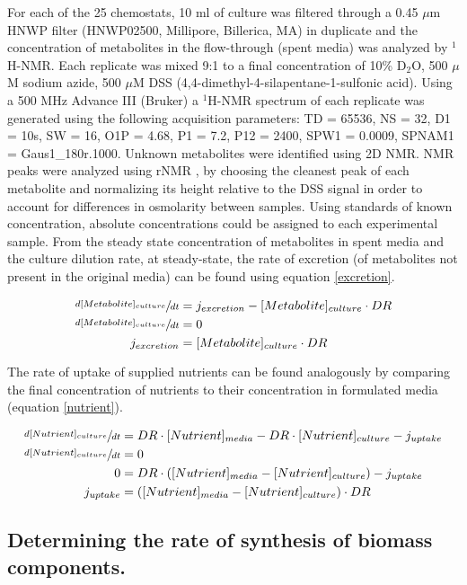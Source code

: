 \documentclass[12pt]{nature}\usepackage{graphicx, color}
\begin{document}
For each of the 25 chemostats, 10 ml of culture was filtered through a 0.45 $\mu$m HNWP filter (HNWP02500, Millipore, Billerica, MA) in duplicate and the concentration of metabolites in the flow-through (spent media) was analyzed by $^{1}$H-NMR.  Each replicate was mixed 9:1 to a final concentration of 10\% D$_{2}$O, 500 $\mu$M sodium azide, 500 $\mu$M DSS (4,4-dimethyl-4-silapentane-1-sulfonic acid).  Using a 500 MHz Advance III (Bruker) a $^{1}$H-NMR spectrum of each replicate was generated using the following acquisition parameters: TD = 65536, NS = 32, D1 = 10s, SW = 16, O1P = 4.68, P1 = 7.2, P12 = 2400, SPW1 = 0.0009, SPNAM1 = Gaus1\_180r.1000.  Unknown metabolites were identified using 2D NMR.  NMR peaks were analyzed using rNMR \cite{Lewis:2009bx}, by choosing the cleanest peak of each metabolite and normalizing its height relative to the DSS signal in order to account for differences in osmolarity between samples.  Using standards of known concentration, absolute concentrations could be assigned to each experimental sample.  From the steady state concentration of metabolites in spent media and the culture dilution rate, at steady-state, the rate of excretion (of metabolites not present in the original media) can be found using equation \ref{excretion}.  

\begin{align}
\sfrac{d[Metabolite]_{culture}}{dt} &= j_{excretion} - [Metabolite]_{culture} \cdot DR\notag\\
\sfrac{d[Metabolite]_{culture}}{dt} &= 0\notag\\
j_{excretion} &= [Metabolite]_{culture} \cdot DR \label{excretion}
\end{align}

The rate of uptake of supplied nutrients can be found analogously by comparing the final concentration of nutrients to their concentration in formulated media (equation \ref{nutrient}).

\begin{align}
\sfrac{d[Nutrient]_{culture}}{dt} &= DR \cdot [Nutrient]_{media} - DR \cdot [Nutrient]_{culture} - j_{uptake}\notag\\
\sfrac{d[Nutrient]_{culture}}{dt} &= 0\notag\\
0 &= DR \cdot ([Nutrient]_{media} - [Nutrient]_{culture}) - j_{uptake}\notag\\
 j_{uptake} &= ([Nutrient]_{media} - [Nutrient]_{culture}) \cdot DR\label{nutrient}
\end{align}

\subsection{Determining the rate of synthesis of biomass components.}
\end{document}

